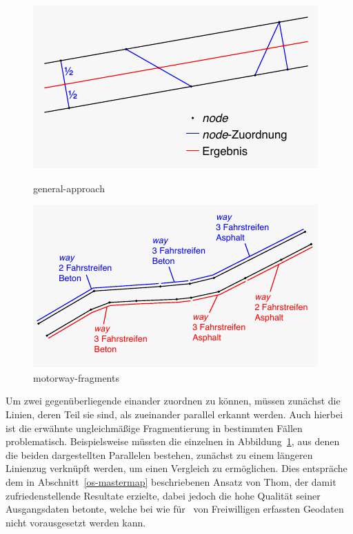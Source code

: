 \documentclass[../main/thesis.tex]{subfiles}
\begin{document}
\begin{figure}[ht]
  \begin{minipage}[t]{.5\linewidth}
    \centering
    \includegraphics[width=\ScaleIfNeeded]{../chapter4/general-approach}
    \caption{general-approach}\label{fig:general-approach}
  \end{minipage}%
  \begin{minipage}[t]{.5\linewidth}
    \centering
    \includegraphics[width=\ScaleIfNeeded]{../chapter4/motorway-fragments}
    \caption{motorway-fragments}\label{fig:motorway-fragments}
  \end{minipage}
\end{figure}

Um zwei gegenüberliegende  einander zuordnen zu können, müssen zunächst die Linien, deren Teil sie sind, als zueinander parallel erkannt werden.
Auch hierbei ist die erwähnte ungleichmäßige Fragmentierung in bestimmten Fällen problematisch.
Beispielsweise müssten die einzelnen  in Abbildung~\ref{fig:motorway-fragments}, aus denen die beiden dargestellten Parallelen bestehen, zunächst zu einem längeren Linienzug verknüpft werden, um einen Vergleich zu ermöglichen.
Dies entspräche dem in Abschnitt~\ref{os-mastermap} beschriebenen Ansatz von Thom, der damit zufriedenstellende Resultate erzielte, dabei jedoch die hohe Qualität seiner Ausgangsdaten betonte, welche bei wie für \osm\ von Freiwilligen erfassten Geodaten nicht vorausgesetzt werden kann.
\end{document}
